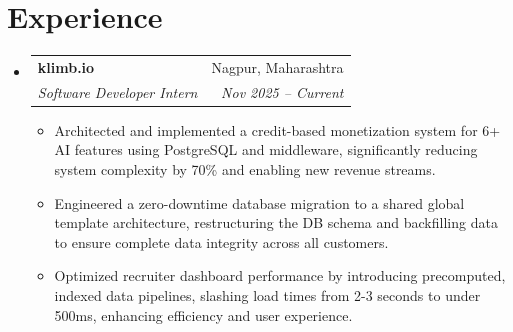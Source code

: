 \documentclass[letterpaper,10pt]{article}
\makeatletter
\newenvironment{resumeList}{
  \begin{itemize}[leftmargin=0.15in, label={}]
}{
  \end{itemize}
}
\newcommand{\resumeItem}[1]{
  \item\small{
    {#1 \vspace{-2.5pt}}
  }
}
\newcommand{\resumeSubheading}[4]{
  \vspace{-2pt}\item
    \begin{tabular*}{0.97\textwidth}[t]{l@{\extracolsep{\fill}}r}
      \textbf{#1} & #2 \\
      \textit{\small#3} & \textit{\small #4} \\
    \end{tabular*}\vspace{-6pt}
}
\newcommand{\resumeItemListStart}{\begin{itemize}[leftmargin=0.15in]}
\newcommand{\resumeItemListEnd}{\end{itemize}\vspace{-5pt}}
\makeatother
\begin{document}
\section{Experience}
\begin{resumeList}
    \resumeSubheading
    {klimb.io}{Nagpur, Maharashtra}
    {Software Developer Intern}{Nov 2025 – Current}
  \resumeItemListStart
    \resumeItem{Architected and implemented a credit-based monetization system for 6+ AI features using PostgreSQL and middleware, significantly reducing system complexity by 70\% and enabling new revenue streams.}
    \resumeItem{Engineered a zero-downtime database migration to a shared global template architecture, restructuring the DB schema and backfilling data to ensure complete data integrity across all customers.}
    \resumeItem{Optimized recruiter dashboard performance by introducing precomputed, indexed data pipelines, slashing load times from 2-3 seconds to under 500ms, enhancing efficiency and user experience.}
  \resumeItemListEnd
\end{resumeList}

\end{document}

